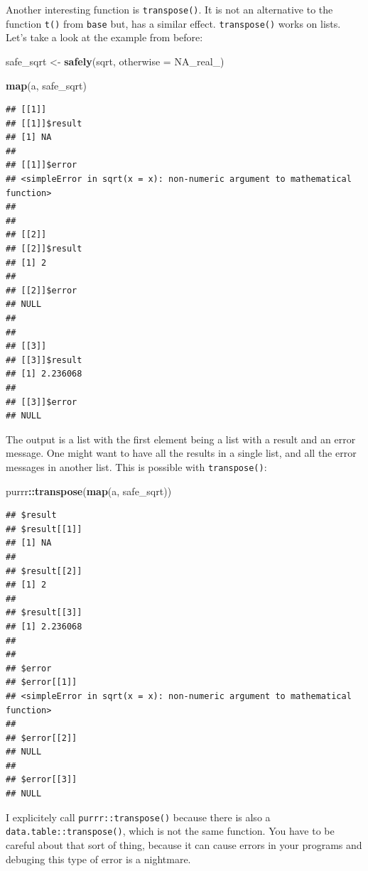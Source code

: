 \documentclass[]{gitbook}
\newenvironment{Shaded}{\begin{snugshade}}{\end{snugshade}}
\newcommand{\DataTypeTok}[1]{\textcolor[rgb]{0.13,0.29,0.53}{#1}}
\newcommand{\KeywordTok}[1]{\textcolor[rgb]{0.13,0.29,0.53}{\textbf{#1}}}
\newcommand{\NormalTok}[1]{#1}
\newcommand{\OperatorTok}[1]{\textcolor[rgb]{0.81,0.36,0.00}{\textbf{#1}}}
\newcommand{\OtherTok}[1]{\textcolor[rgb]{0.56,0.35,0.01}{#1}}
\newcommand{\StringTok}[1]{\textcolor[rgb]{0.31,0.60,0.02}{#1}}
\theoremstyle{definition}
\theoremstyle{definition}
\theoremstyle{definition}
\theoremstyle{remark}
\begin{document}
Another interesting function is \texttt{transpose()}. It is not an
alternative to the function \texttt{t()} from \texttt{base} but, has a
similar effect. \texttt{transpose()} works on lists. Let's take a look
at the example from before:

\begin{Shaded}
\begin{Highlighting}[]
\NormalTok{safe_sqrt <-}\StringTok{ }\KeywordTok{safely}\NormalTok{(sqrt, }\DataTypeTok{otherwise =} \OtherTok{NA_real_}\NormalTok{)}

\KeywordTok{map}\NormalTok{(a, safe_sqrt)}
\end{Highlighting}
\end{Shaded}

\begin{verbatim}
## [[1]]
## [[1]]$result
## [1] NA
## 
## [[1]]$error
## <simpleError in sqrt(x = x): non-numeric argument to mathematical function>
## 
## 
## [[2]]
## [[2]]$result
## [1] 2
## 
## [[2]]$error
## NULL
## 
## 
## [[3]]
## [[3]]$result
## [1] 2.236068
## 
## [[3]]$error
## NULL
\end{verbatim}

The output is a list with the first element being a list with a result
and an error message. One might want to have all the results in a single
list, and all the error messages in another list. This is possible with
\texttt{transpose()}:

\begin{Shaded}
\begin{Highlighting}[]
\NormalTok{purrr}\OperatorTok{::}\KeywordTok{transpose}\NormalTok{(}\KeywordTok{map}\NormalTok{(a, safe_sqrt))}
\end{Highlighting}
\end{Shaded}

\begin{verbatim}
## $result
## $result[[1]]
## [1] NA
## 
## $result[[2]]
## [1] 2
## 
## $result[[3]]
## [1] 2.236068
## 
## 
## $error
## $error[[1]]
## <simpleError in sqrt(x = x): non-numeric argument to mathematical function>
## 
## $error[[2]]
## NULL
## 
## $error[[3]]
## NULL
\end{verbatim}

I explicitely call \texttt{purrr::transpose()} because there is also a
\texttt{data.table::transpose()}, which is not the same function. You
have to be careful about that sort of thing, because it can cause errors
in your programs and debuging this type of error is a nightmare.
\end{document}
